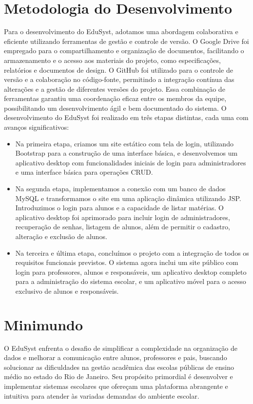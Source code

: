 \documentclass[main.tex]{subfiles}
\begin{document}
\section{Metodologia do Desenvolvimento}
Para o desenvolvimento do EduSyst, adotamos uma abordagem colaborativa e eficiente utilizando ferramentas de gestão e controle de versão. O Google Drive foi empregado para o compartilhamento e organização de documentos, facilitando o armazenamento e o acesso aos materiais do projeto, como especificações, relatórios e documentos de design. 
O GitHub foi utilizado para o controle de versão e a colaboração no código-fonte, permitindo a integração contínua das alterações e a gestão de diferentes versões do projeto. Essa combinação de ferramentas garantiu uma coordenação eficaz entre os membros da equipe, possibilitando um desenvolvimento ágil e bem documentado do sistema. O desenvolvimento do EduSyst foi realizado em três etapas distintas, cada uma com avanços significativos:
\begin{itemize}
    \item Na primeira etapa, criamos um site estático com tela de login, utilizando Bootstrap para a construção de uma interface básica, e desenvolvemos um aplicativo desktop com funcionalidades iniciais de login para administradores e uma interface básica para operações CRUD.
    \item Na segunda etapa, implementamos a conexão com um banco de dados MySQL e transformamos o site em uma aplicação dinâmica utilizando JSP. Introduzimos o login para alunos e a capacidade de listar matérias. O aplicativo desktop foi aprimorado para incluir login de administradores, recuperação de senhas, listagem de alunos, além de permitir o cadastro, alteração e exclusão de alunos.
    \item Na terceira e última etapa, concluímos o projeto com a integração de todos os requisitos funcionais previstos. O sistema agora inclui um site público com login para professores, alunos e responsáveis, um aplicativo desktop completo para a administração do sistema escolar, e um aplicativo móvel para o acesso exclusivo de alunos e responsáveis.
\end{itemize}

\section{Minimundo}
O EduSyst enfrenta o desafio de simplificar a complexidade na organização de dados e melhorar a comunicação entre alunos, professores e pais, buscando solucionar as dificuldades na gestão acadêmica das escolas públicas de ensino médio no estado do Rio de Janeiro. Seu propósito primordial é desenvolver e implementar sistemas escolares que ofereçam uma plataforma abrangente e intuitiva para atender às variadas demandas do ambiente escolar.
\end{document}
